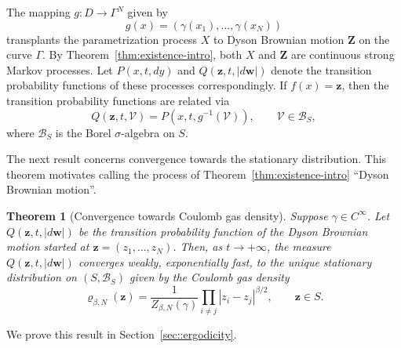 \documentclass[11pt]{article}
\numberwithin{equation}{section}
\newtheorem{theorem}{Theorem}[section]
\theoremstyle{definition}
\begin{document}
The mapping $g:D\to\Gamma^{N}$ given by
\[
    g(x) = \left(\gamma(x_{1}),\dots,\gamma(x_{N})\right)
\]
transplants the parametrization process $X$ to Dyson Brownian motion $\boldsymbol{Z}$ on the curve $\Gamma$. By Theorem~\ref{thm:existence-intro}, both $X$ and $\boldsymbol{Z}$ are continuous strong Markov processes. Let $P(x,t,dy)$ and $Q(\boldsymbol{z}, t, |d\boldsymbol{w}|)$ denote the transition probability functions of these processes correspondingly. If $f(x) = \boldsymbol{z}$, then the transition probability functions are related via 
\[
    Q(\boldsymbol{z}, t, \mathcal{V}) = P(x,t,g^{-1}(\mathcal{V})), \qquad \mathcal{V}\in\mathcal{B}_{S},
\]
where $\mathcal{B}_{S}$ is the Borel $\sigma$-algebra on $S$.

The next result concerns convergence towards the stationary distribution. This theorem motivates calling the process of Theorem~\ref{thm:existence-intro} ``Dyson Brownian motion''.
\begin{theorem}[Convergence towards Coulomb gas density]\label{thm::exp_conv_to_stationary_distribution}
Suppose $\gamma \in C^\infty$. Let $Q(\boldsymbol{z}, t, |d\boldsymbol{w}|)$ be the transition probability function of the Dyson Brownian motion started at $\boldsymbol{z} = (z_{1},\dots, z_{N})$. Then, as $t\to+\infty$, the measure $Q(\boldsymbol{z}, t, |d\boldsymbol{w}|)$ converges weakly, exponentially fast, to the unique stationary distribution on $(S, \mathcal{B}_{S})$ given by the Coulomb gas density 
\begin{equation}\label{eq:density_z}
     \varrho_{\beta,N}(\boldsymbol{z})=\frac{1}{Z_{\beta,N}(\gamma)}\prod_{i \neq j } |z_i -z_j|^{\beta/2},\qquad \boldsymbol{z}\in S.
\end{equation}
\end{theorem}
\noindent We prove this result in Section~\ref{sec::ergodicity}.
\end{document}
